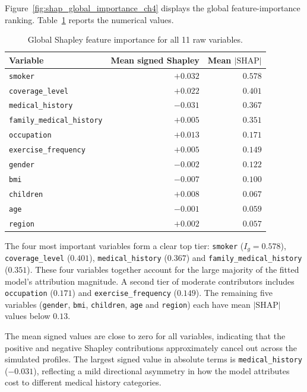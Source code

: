 \noindent
Figure~\ref{fig:shap_global_importance_ch4} displays the global
feature-importance ranking. Table~\ref{tab:shap_global_importance_ch4}
reports the numerical values.

\begin{table}[H]
\centering
\small
\renewcommand{\arraystretch}{1.15}
\begin{tabular}{lrr}
\toprule
\textbf{Variable} & \textbf{Mean signed Shapley} & \textbf{Mean $|\text{SHAP}|$} \\
\midrule
\texttt{smoker} & $+0.032$ & $0.578$ \\
\texttt{coverage\_\allowbreak{}level} & $+0.022$ & $0.401$ \\
\texttt{medical\_\allowbreak{}history} & $-0.031$ & $0.367$ \\
\texttt{family\_medical\_\allowbreak{}history} & $+0.005$ & $0.351$ \\
\texttt{occupation} & $+0.013$ & $0.171$ \\
\texttt{exercise\_\allowbreak{}frequency} & $+0.005$ & $0.149$ \\
\texttt{gender} & $-0.002$ & $0.122$ \\
\texttt{bmi} & $-0.007$ & $0.100$ \\
\texttt{children} & $+0.008$ & $0.067$ \\
\texttt{age} & $-0.001$ & $0.059$ \\
\texttt{region} & $+0.002$ & $0.057$ \\
\bottomrule
\end{tabular}
\caption{Global Shapley feature importance for all 11 raw variables.}
\label{tab:shap_global_importance_ch4}
\end{table}

\noindent
The four most important variables form a clear top tier:
\texttt{smoker} ($I_g = 0.578$), \texttt{coverage\_\allowbreak{}level} ($0.401$),
\texttt{medical\_\allowbreak{}history} ($0.367$) and
\texttt{family\_medical\_\allowbreak{}history} ($0.351$). These four variables
together account for the large majority of the fitted model's
attribution magnitude. A second tier of moderate contributors includes
\texttt{occupation} ($0.171$) and \texttt{exercise\_\allowbreak{}frequency}
($0.149$). The remaining five variables (\texttt{gender},
\texttt{bmi}, \texttt{children}, \texttt{age} and \texttt{region})
each have mean $|\text{SHAP}|$ values below $0.13$.

The mean signed values are close to zero for all variables, indicating
that the positive and negative Shapley contributions approximately
cancel out across the simulated profiles. The largest signed value in
absolute terms is \texttt{medical\_\allowbreak{}history} ($-0.031$), reflecting a
mild directional asymmetry in how the model attributes cost to different
medical history categories.

